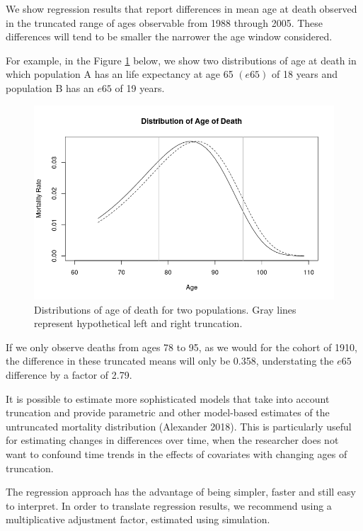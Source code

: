 \documentclass[
  11pt,
]{article}
\begin{document}
We show regression results that report differences in mean age at death
observed in the truncated range of ages observable from 1988 through
2005. These differences will tend to be smaller the narrower the age
window considered.

For example, in the Figure \ref{fig:distribution_age_of_death} below, we
show two distributions of age at death in which population A has an life
expectancy at age 65 \((e65)\) of 18 years and population B has an
\(e65\) of 19 years.

\begin{figure}[H]
  \centering
  \includegraphics[width=6in]{../illustrations/distribution_age_of_death.png}
  \caption{Distributions of age of death for two populations. Gray lines represent hypothetical left and right truncation.}
  \label{fig:distribution_age_of_death}
\end{figure}

If we only observe deaths from ages 78 to 95, as we would for the cohort
of 1910, the difference in these truncated means will only be 0.358,
understating the \(e65\) difference by a factor of 2.79.

It is possible to estimate more sophisticated models that take into
account truncation and provide parametric and other model-based
estimates of the untruncated mortality distribution (Alexander 2018).
This is particularly useful for estimating changes in differences over
time, when the researcher does not want to confound time trends in the
effects of covariates with changing ages of truncation.

The regression approach has the advantage of being simpler, faster and
still easy to interpret. In order to translate regression results, we
recommend using a multiplicative adjustment factor, estimated using
simulation.
\end{document}
